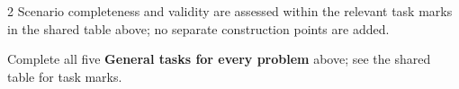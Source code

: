 \begin{multicols}{2}
Scenario completeness and validity are assessed within the relevant task marks in the shared table above; no separate construction points are added.

\par\smallskip
Complete all five \textbf{General tasks for every problem} above; see the shared table for task marks.




\end{multicols}

